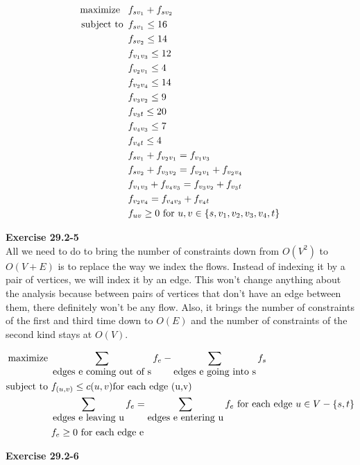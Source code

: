 \documentclass{article}
\begin{document}
\begin{align*}
\mbox{maximize \,\,\,} & f_{sv_1} + f_{sv_2}\\
\mbox{subject to \,} & f_{sv_1} \leq 16 \\
& f_{sv_2} \leq 14 \\
& f_{v_1v_3} \leq 12 \\
& f_{v_2v_1} \leq 4 \\
& f_{v_2v_4} \leq 14 \\
& f_{v_3v_2} \leq 9 \\
& f_{v_3t} \leq 20 \\
& f_{v_4v_3} \leq 7 \\
& f_{v_4t} \leq 4 \\
& f_{sv_1} + f_{v_2v_1} = f_{v_1v_3} \\
& f_{sv_2} + f_{v_3v_2} = f_{v_2v_1} + f_{v_2v_4} \\
& f_{v_1v_3} + f_{v_4v_3} = f_{v_3v_2} + f_{v_3t} \\
& f_{v_2v_4} = f_{v_4v_3} + f_{v_4t} \\
&f_{uv} \geq 0 \mbox{ for } u,v \in \{s, v_1, v_2, v_3, v_4, t\}
\end{align*}

\noindent\textbf{Exercise 29.2-5}\\

All we need to do to bring the number of constraints down from $O(V^2)$ to $O(V+E)$ is to replace the way we index the flows. Instead of indexing it by a pair of vertices, we will index it by an edge. This won't change anything about the analysis because between pairs of vertices that don't have an edge between them, there definitely won't be any flow. Also, it brings the number of constraints of the first and third time down to $O(E)$ and the number of constraints of the second kind stays at $O(V)$.

\begin{align*}
\hbox{maximize }&\sum_{\hbox{edges e coming out of s}} f_e - \sum_{\hbox{edges e going into s}} f_s\\
\hbox{subject to }& f_{(u,v)}\le c(u,v)\hbox{for each edge (u,v)}\\
& \sum_{\hbox{edges e leaving u}} f_e = \sum_{\hbox{edges e entering u}} f_e \hbox{  for each edge $u \in V-\{s,t\}$}\\
&f_e \ge 0 \hbox{  for each edge e}
\end{align*}

\noindent\textbf{Exercise 29.2-6}\\
\end{document}
